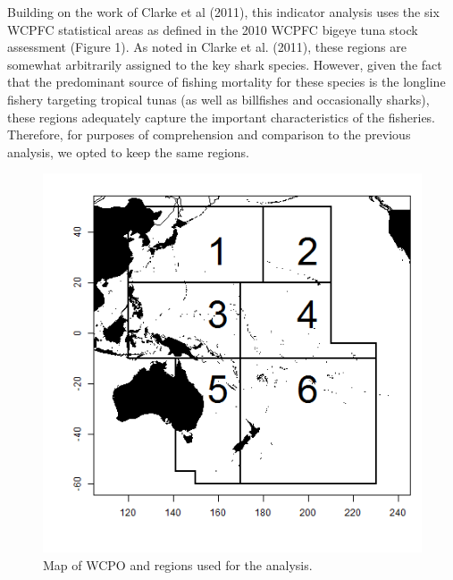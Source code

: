 \documentclass[12pt]{SCreport}
\begin{document}
Building on the work of Clarke et al (2011), this indicator analysis uses the six WCPFC statistical areas as defined in the 2010 WCPFC bigeye tuna stock assessment (Figure 1). As noted in Clarke et al. (2011), these regions are somewhat arbitrarily assigned to the key shark species. However, given the fact that the predominant source of fishing mortality for these species is the longline fishery targeting tropical tunas (as well as billfishes and occasionally sharks), these regions adequately capture the important characteristics of the fisheries. Therefore, for purposes of comprehension and comparison to the previous analysis, we opted to keep the same regions. 



\begin{figure}
\begin{center}
\includegraphics[scale=0.95]{../GRAPHICS/Defined/FIG_01_MAP}
\caption{\label{fig:regions} Map of WCPO and regions used for the analysis.}
\end{center}
\end{figure}

\end{document}
